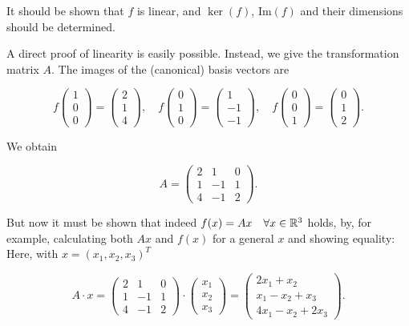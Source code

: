 It should be shown that \(f\) is linear, and \(\ker(f)\), \(\text{Im}(f)\) and their dimensions should be determined.

A direct proof of linearity is easily possible. Instead, we give the transformation matrix \(A\). The images of the (canonical) basis vectors are

\[
    f\begin{pmatrix}
    1 \\
    0 \\
    0
    \end{pmatrix} =
    \begin{pmatrix}
    2 \\
    1 \\
    4
    \end{pmatrix} , \quad
    f\begin{pmatrix}
    0 \\
    1 \\
    0
    \end{pmatrix} =
    \begin{pmatrix}
    1 \\
    -1 \\
    -1
    \end{pmatrix} , \quad
    f\begin{pmatrix}
    0 \\
    0 \\
    1
    \end{pmatrix} =
    \begin{pmatrix}
    0 \\
    1 \\
    2
    \end{pmatrix} .
\]

We obtain

\[
    A =
    \begin{pmatrix}
    2 & 1 & 0 \\
    1 & -1 & 1 \\
    4 & -1 & 2
    \end{pmatrix} .
\]

But now it must be shown that indeed \(f(x) = Ax \quad \forall x \in \mathbb{R}^3\) holds, by, 
for example, calculating both \(Ax\) and \(f(x)\) for a 
general \(x\) and showing equality: Here, with \(x = {(x_1, x_2, x_3)}^T\)

\[
    A \cdot x =
    \begin{pmatrix}
    2 & 1 & 0 \\
    1 & -1 & 1 \\
    4 & -1 & 2
    \end{pmatrix}
    \cdot
    \begin{pmatrix}
    x_1 \\
    x_2 \\
    x_3
    \end{pmatrix} =
    \begin{pmatrix}
    2x_1 + x_2 \\
    x_1 - x_2 + x_3 \\
    4x_1 - x_2 + 2x_3
    \end{pmatrix} .
\]

